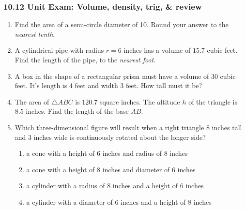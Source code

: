 \documentclass[12pt, twoside]{article}
\begin{document}
\subsubsection*{10.12 Unit Exam: Volume, density, trig, \& review}
 \begin{enumerate}

  \item Find the area of a semi-circle diameter of 10. Round your answer to the  \emph{nearest tenth}.\vspace{3cm}

  \item A cylindrical pipe with radius $r=6$ inches has a volume of $15.7$ cubic feet. Find the length of the pipe, to the \emph{nearest foot}. \vspace{3.5cm}
  \item A box in the shape of a rectangular prism must have a volume of 30 cubic feet. It's length is 4 feet and width 3 feet. How tall must it be? \vspace{3.0cm}

  \item The area of $\triangle ABC$ is $120.7$ square inches. The altitude $h$ of the triangle is 8.5 inches. Find the length of the base $AB$.\\[0.5cm]
   \vspace{0.5cm}

\newpage
\item Which three-dimensional figure will result when a right triangle 8 inches tall and 3 inches wide is continuously rotated about the longer side?
  \begin{enumerate}
    \item a cone with a height of 6 inches and radius of 8 inches
    \item a cone with a height of 8 inches and diameter of 6 inches
    \item a cylinder with a radius of 8 inches and a height of 6 inches
    \item a cylinder with a diameter of 6 inches and a height of 8 inches
  \end{enumerate}


\end{enumerate}
\end{document}
